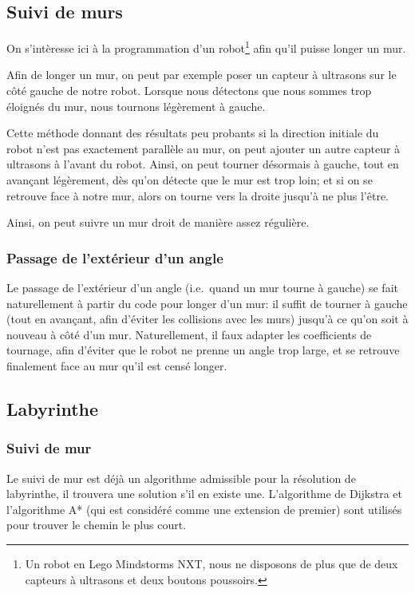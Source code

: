 \subsection{Suivi de murs}
  On s'intèresse ici à la programmation d'un robot\footnote{Un robot en Lego
  Mindstorms NXT, nous ne disposons de plus que de deux capteurs à ultrasons et
  deux boutons poussoirs.} afin qu'il puisse longer un mur.

  Afin de longer un mur, on peut par exemple poser un capteur à ultrasons sur
  le côté gauche de notre robot. Lorsque nous détectons que nous sommes trop
  éloignés du mur, nous tournons légèrement à gauche.

  Cette méthode donnant des résultats peu probants si la direction initiale du
  robot n'est pas exactement parallèle au mur, on peut ajouter un autre capteur
  à ultrasons à l'avant du robot. Ainsi, on peut tourner désormais à gauche,
  tout en avançant légèrement, dès qu'on détecte que le mur est trop loin; et
  si on se retrouve face à notre mur, alors on tourne vers la droite jusqu'à ne
  plus l'être.

  Ainsi, on peut suivre un mur droit de manière assez régulière.

  \subsubsection{Passage de l'extérieur d'un angle}
    Le passage de l'extérieur d'un angle (i.e.\ quand un mur tourne à gauche)
    se fait naturellement à partir du code pour longer d'un mur: il suffit de
    tourner à gauche (tout en avançant, afin d'éviter les collisions avec les
    murs) jusqu'à ce qu'on soit à nouveau à côté d'un mur. Naturellement, il
    faux adapter les coefficients de tournage, afin d'éviter que le robot ne
    prenne un angle trop large, et se retrouve finalement face au mur qu'il est
    censé longer.

\subsection{Labyrinthe}
  \subsubsection{Suivi de mur}
    Le suivi de mur est déjà un algorithme admissible pour la résolution de
    labyrinthe, il trouvera une solution s'il en existe une. L'algorithme de
    Dijkstra et l'algorithme A* (qui est considéré comme une extension de
    premier) sont utilisés pour trouver le chemin le plus court.

